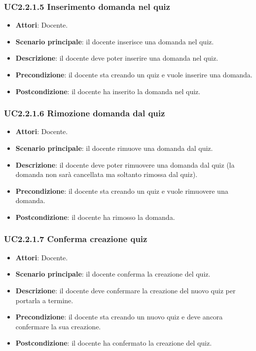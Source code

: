 \subsubsection{UC2.2.1.5 Inserimento domanda nel quiz}
\begin{itemize}
\item \textbf{Attori}: Docente.
\item \textbf{Scenario principale}: il docente inserisce una domanda nel quiz.
\item \textbf{Descrizione}: il docente deve poter inserire una domanda nel quiz.
\item \textbf{Precondizione}: il docente sta creando un quiz e vuole inserire una domanda.
\item \textbf{Postcondizione}: il docente ha inserito la domanda nel quiz.
\end{itemize}
\subsubsection{UC2.2.1.6 Rimozione domanda dal quiz}
\begin{itemize}
\item \textbf{Attori}: Docente.
\item \textbf{Scenario principale}: il docente rimuove una domanda dal quiz.
\item \textbf{Descrizione}: il docente deve poter rimuovere una domanda dal quiz (la domanda non sarà cancellata ma soltanto rimossa dal quiz).
\item \textbf{Precondizione}: il docente sta creando un quiz e vuole rimuovere una domanda.
\item \textbf{Postcondizione}: il docente ha rimosso la domanda.
\end{itemize}
\subsubsection{UC2.2.1.7 Conferma creazione quiz}
\begin{itemize}
\item \textbf{Attori}: Docente.
\item \textbf{Scenario principale}: il docente conferma la creazione del quiz.
\item \textbf{Descrizione}: il docente deve confermare la creazione del nuovo quiz per portarla a termine.
\item \textbf{Precondizione}: il docente sta creando un nuovo quiz e deve ancora confermare la sua creazione.
\item \textbf{Postcondizione}: il docente ha confermato la creazione del quiz.
\end{itemize}
